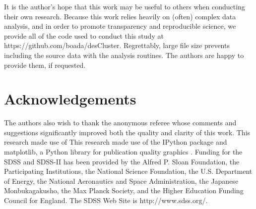 \documentclass[fleqn,usenatbib]{mnras}
\begin{document}
It is the author's hope that this work may be useful to others when conducting their own research. Because this work relies heavily on (often) complex data analysis, and in order to promote transparency and reproducible science, we provide all of the code used to conduct this study at https://github.com/boada/desCluster. Regrettably, large file size prevents including the source data with the analysis routines. The authors are happy to provide them, if requested.

\section*{Acknowledgements}
The authors also wish to thank the anonymous referee whose comments and suggestions significantly improved both the quality and clarity of this work. This research made use of This research made use of the {\sc IPython} package \citep{Perez2007} and {\sc matplotlib}, a Python library for publication quality graphics \citep{Hunter2007}. Funding for the SDSS and SDSS-II has been provided by the Alfred P. Sloan Foundation, the Participating Institutions, the National Science Foundation, the U.S. Department of Energy, the National Aeronautics and Space Administration, the Japanese Monbukagakusho, the Max Planck Society, and the Higher Education Funding Council for England. The SDSS Web Site is http://www.sdss.org/.



%
%

\bsp	%
\label{lastpage}
\end{document}
